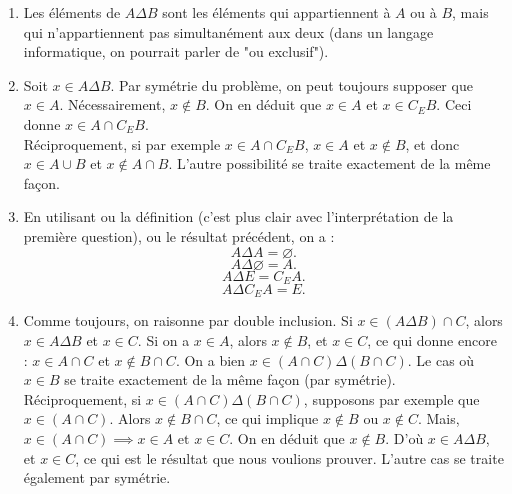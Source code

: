 \documentclass[11pt,a4paper]{article}
\begin{document}
	\begin{corrige}
		\begin{enumerate}
			
			\item  Les éléments de $A\Delta B$ sont les éléments qui appartiennent à $A$ ou à $B$, mais qui n'appartiennent pas simultanément aux deux (dans un langage informatique, on pourrait parler de "ou exclusif").
			
			\item  Soit $x\in A\Delta B$. Par symétrie du problème, on peut toujours supposer que $x\in A$. Nécessairement, $x\notin B$. On en déduit que $x\in A$ et
			$x\in C_E B$. Ceci donne $x\in A\cap C_EB$.\\
			
			Réciproquement, si par exemple $x\in A\cap C_EB$, $x\in A$ et $x\notin B$, et donc $x\in A\cup B$ et $x\notin A\cap B$. L'autre possibilité se traite exactement de la même façon.
			
			\item  En utilisant ou la définition (c'est plus clair avec l'interprétation de la première question), ou le résultat précédent, on a :
			$$A\Delta A=\varnothing.$$
			$$A\Delta \varnothing=A.$$
			$$A\Delta E=C_E A.$$
			$$A\Delta C_E A=E.$$
			
			\item  Comme toujours, on raisonne par double inclusion. Si $x\in (A\Delta B)\cap C$, alors $x\in A\Delta B$ et $x\in C$. Si on a $x\in A$, alors $x\notin B$, et $x\in C$, ce qui donne encore : $x\in A\cap C$ et $x\notin B\cap C$. On a bien $x\in (A\cap C)\Delta (B\cap C)$. Le cas où $x\in B$ se traite exactement de la même façon (par symétrie).\\
			
			Réciproquement, si $x\in (A\cap C)\Delta (B\cap C)$, supposons par exemple que $x\in (A\cap C)$. Alors $x\notin B\cap C$, ce qui implique $x\notin B$ ou $x\notin C$. Mais, $x\in (A\cap C)\implies x\in A\textrm{ et }x\in C$. On en déduit que $x\notin B$. D'où $x\in A\Delta B$, et $x\in C$, ce qui est le résultat que nous voulions prouver. L'autre cas se traite également par symétrie.\\
			
			
		\end{enumerate}
	\end{corrige}
	
\end{document}
